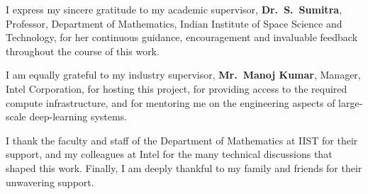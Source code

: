 I express my sincere gratitude to my academic supervisor,
\textbf{Dr.\ S.\ Sumitra}, Professor, Department of Mathematics, Indian
Institute of Space Science and Technology, for her continuous guidance,
encouragement and invaluable feedback throughout the course of this work.

I am equally grateful to my industry supervisor, \textbf{Mr.\ Manoj Kumar},
Manager, Intel Corporation, for hosting this project, for providing access to
the required compute infrastructure, and for mentoring me on the engineering
aspects of large-scale deep-learning systems.

I thank the faculty and staff of the Department of Mathematics at IIST for
their support, and my colleagues at Intel for the many technical discussions
that shaped this work. Finally, I am deeply thankful to my family and friends
for their unwavering support.

\vspace{15mm}
\hfill \Author \hspace{5mm}
